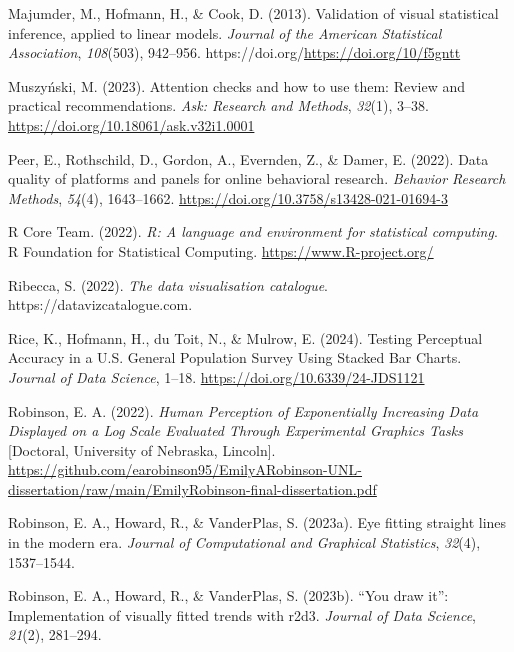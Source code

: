 \documentclass[
  10pt,
]{article}
\newlength{\cslhangindent}
\newenvironment{CSLReferences}[2] %
 {\begin{list}{}{%
  \setlength{\itemindent}{0pt}
  \setlength{\leftmargin}{0pt}
  \setlength{\parsep}{0pt}
  \ifodd #1
   \setlength{\leftmargin}{\cslhangindent}
   \setlength{\itemindent}{-1\cslhangindent}
  \fi
  \setlength{\itemsep}{#2\baselineskip}}}
 {\end{list}}
\begin{document}
\begin{CSLReferences}{1}{0}
Majumder, M., Hofmann, H., \& Cook, D. (2013). Validation of visual
statistical inference, applied to linear models. \emph{Journal of the
American Statistical Association}, \emph{108}(503), 942--956.
https://doi.org/\url{https://doi.org/10/f5gntt}

Muszyński, M. (2023). Attention checks and how to use them: {Review} and
practical recommendations. \emph{Ask: Research and Methods},
\emph{32}(1), 3--38. \url{https://doi.org/10.18061/ask.v32i1.0001}

Peer, E., Rothschild, D., Gordon, A., Evernden, Z., \& Damer, E. (2022).
Data quality of platforms and panels for online behavioral research.
\emph{Behavior Research Methods}, \emph{54}(4), 1643--1662.
\url{https://doi.org/10.3758/s13428-021-01694-3}

R Core Team. (2022). \emph{R: A language and environment for statistical
computing}. R Foundation for Statistical Computing.
\url{https://www.R-project.org/}

Ribecca, S. (2022). \emph{The data visualisation catalogue}.
https://datavizcatalogue.com.

Rice, K., Hofmann, H., du Toit, N., \& Mulrow, E. (2024). Testing
{Perceptual Accuracy} in a {U}.{S}. {General Population Survey Using
Stacked Bar Charts}. \emph{Journal of Data Science}, 1--18.
\url{https://doi.org/10.6339/24-JDS1121}

Robinson, E. A. (2022). \emph{Human {Perception} of {Exponentially}
{Increasing} {Data} {Displayed} on a {Log} {Scale} {Evaluated} {Through}
{Experimental} {Graphics} {Tasks}} {[}Doctoral, University of Nebraska,
Lincoln{]}.
\url{https://github.com/earobinson95/EmilyARobinson-UNL-dissertation/raw/main/EmilyRobinson-final-dissertation.pdf}

Robinson, E. A., Howard, R., \& VanderPlas, S. (2023a). Eye fitting
straight lines in the modern era. \emph{Journal of Computational and
Graphical Statistics}, \emph{32}(4), 1537--1544.

Robinson, E. A., Howard, R., \& VanderPlas, S. (2023b). {``You draw
it''}: Implementation of visually fitted trends with r2d3. \emph{Journal
of Data Science}, \emph{21}(2), 281--294.


\end{CSLReferences}
\end{document}
